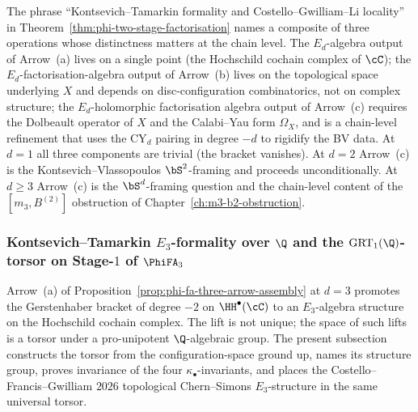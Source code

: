 \begin{remark}
\label{rem:three-arrow-distinction-precise}
The phrase ``Kontsevich--Tamarkin formality and Costello--Gwilliam--Li locality'' in Theorem~\ref{thm:phi-two-stage-factorisation} names a composite of three operations whose distinctness matters at the chain level. The $E_d$-algebra output of Arrow~\textup{(a)} lives on a single point (the Hochschild cochain complex of $\cC$); the $E_d$-factorisation-algebra output of Arrow~\textup{(b)} lives on the topological space underlying $X$ and depends on disc-configuration combinatorics, not on complex structure; the $E_d$-holomorphic factorisation algebra output of Arrow~\textup{(c)} requires the Dolbeault operator of $X$ and the Calabi--Yau form $\Omega_X$, and is a chain-level refinement that uses the CY$_d$ pairing in degree $-d$ to rigidify the BV data. At $d = 1$ all three components are trivial (the bracket vanishes). At $d = 2$ Arrow~\textup{(c)} is the Kontsevich--Vlassopoulos $\bS^2$-framing and proceeds unconditionally. At $d \geq 3$ Arrow~\textup{(c)} is the $\bS^d$-framing question and the chain-level content of the $[m_3, B^{(2)}]$ obstruction of Chapter~\ref{ch:m3-b2-obstruction}.
\end{remark}

\subsubsection{Kontsevich--Tamarkin $E_3$-formality over $\Q$ and the $\mathrm{GRT}_1(\Q)$-torsor on Stage-$1$ of $\PhiFA_3$}
\label{subsubsec:kt-e3-formality-grt1-torsor-cfg2026}

Arrow~(a) of Proposition~\ref{prop:phi-fa-three-arrow-assembly} at $d = 3$ promotes the Gerstenhaber bracket of degree $-2$ on $\HH^\bullet(\cC)$ to an $E_3$-algebra structure on the Hochschild cochain complex. The lift is not unique; the space of such lifts is a torsor under a pro-unipotent $\Q$-algebraic group. The present subsection constructs the torsor from the configuration-space ground up, names its structure group, proves invariance of the four $\kappa_\bullet$-invariants, and places the Costello--Francis--Gwilliam $2026$ topological Chern--Simons $E_3$-structure in the same universal torsor.

